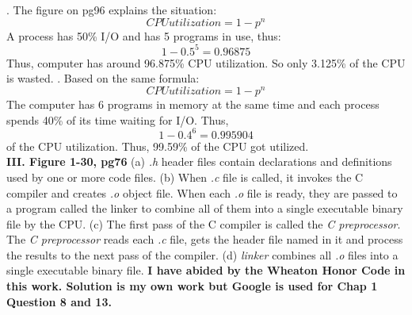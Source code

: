 \documentclass[12pt]{article}
\begin{document}
.  The figure on pg96 explains the situation:
\begin{equation}
CPU  utilization = 1 - p^ n
\end{equation}
A process has 50\% I/O and has 5 programs in use, thus:
\begin{equation}
1 - 0.5^5 = 0.96875 
\end{equation}
Thus, computer has around 96.875\% CPU utilization. So only 3.125\% of the CPU is wasted.\hfill \break
{}. Based on the same formula:
\begin{equation}
CPU  utilization = 1 - p^ n
\end{equation}
The computer has 6 programs in memory at the same time and each process spends 40\% of its time waiting for I/O. Thus,
\begin{equation}
1-0.4^6 = 0.995904
\end{equation}
of the CPU utilization. Thus, 99.59\% of the CPU got utilized.\hfill \break
\newline \\
\textbf{III. Figure 1-30, pg76}\hfill \break 
(a)\textit{ .h} header files contain declarations and definitions used by one or more code files.\hfill \break
(b) When \textit{.c} file is called, it invokes the C compiler and creates \textit{.o} object file. When each \textit{.o} file is ready, they are passed to a program called the linker to combine all of them into a single executable binary file by the CPU. \hfill \break
(c)	The first pass of the C compiler is called the \textit{C preprocessor}. The \textit{C preprocessor} reads each \textit{.c} file, gets the header file named in it and process the results to the next pass of the compiler. \hfill \break
(d) \textit{linker} combines all \textit{.o} files into a single executable binary file. \hfill \break
\hfill \break
\hfill \break
\hfill \break
\hfill \break
\hfill \break
{\textbf{I have abided by the Wheaton Honor Code in this work. Solution is my own work but Google is used for Chap 1 Question 8 and 13.    }}\hfill \break

\end{document}
